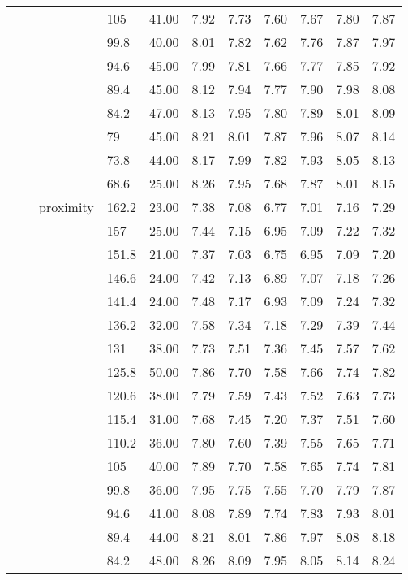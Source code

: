 \begin{longtable}{llllrrrrrrr}
   &  &  & 105 & 41.00 & 7.92 & 7.73 & 7.60 & 7.67 & 7.80 & 7.87 \\ 
   &  &  & 99.8 & 40.00 & 8.01 & 7.82 & 7.62 & 7.76 & 7.87 & 7.97 \\ 
   &  &  & 94.6 & 45.00 & 7.99 & 7.81 & 7.66 & 7.77 & 7.85 & 7.92 \\ 
   &  &  & 89.4 & 45.00 & 8.12 & 7.94 & 7.77 & 7.90 & 7.98 & 8.08 \\ 
   &  &  & 84.2 & 47.00 & 8.13 & 7.95 & 7.80 & 7.89 & 8.01 & 8.09 \\ 
   &  &  & 79 & 45.00 & 8.21 & 8.01 & 7.87 & 7.96 & 8.07 & 8.14 \\ 
   &  &  & 73.8 & 44.00 & 8.17 & 7.99 & 7.82 & 7.93 & 8.05 & 8.13 \\ 
   &  &  & 68.6 & 25.00 & 8.26 & 7.95 & 7.68 & 7.87 & 8.01 & 8.15 \\ 
   &  & proximity & 162.2 & 23.00 & 7.38 & 7.08 & 6.77 & 7.01 & 7.16 & 7.29 \\ 
   &  &  & 157 & 25.00 & 7.44 & 7.15 & 6.95 & 7.09 & 7.22 & 7.32 \\ 
   &  &  & 151.8 & 21.00 & 7.37 & 7.03 & 6.75 & 6.95 & 7.09 & 7.20 \\ 
   &  &  & 146.6 & 24.00 & 7.42 & 7.13 & 6.89 & 7.07 & 7.18 & 7.26 \\ 
   &  &  & 141.4 & 24.00 & 7.48 & 7.17 & 6.93 & 7.09 & 7.24 & 7.32 \\ 
   &  &  & 136.2 & 32.00 & 7.58 & 7.34 & 7.18 & 7.29 & 7.39 & 7.44 \\ 
   &  &  & 131 & 38.00 & 7.73 & 7.51 & 7.36 & 7.45 & 7.57 & 7.62 \\ 
   &  &  & 125.8 & 50.00 & 7.86 & 7.70 & 7.58 & 7.66 & 7.74 & 7.82 \\ 
   &  &  & 120.6 & 38.00 & 7.79 & 7.59 & 7.43 & 7.52 & 7.63 & 7.73 \\ 
   &  &  & 115.4 & 31.00 & 7.68 & 7.45 & 7.20 & 7.37 & 7.51 & 7.60 \\ 
   &  &  & 110.2 & 36.00 & 7.80 & 7.60 & 7.39 & 7.55 & 7.65 & 7.71 \\ 
   &  &  & 105 & 40.00 & 7.89 & 7.70 & 7.58 & 7.65 & 7.74 & 7.81 \\ 
   &  &  & 99.8 & 36.00 & 7.95 & 7.75 & 7.55 & 7.70 & 7.79 & 7.87 \\ 
   &  &  & 94.6 & 41.00 & 8.08 & 7.89 & 7.74 & 7.83 & 7.93 & 8.01 \\ 
   &  &  & 89.4 & 44.00 & 8.21 & 8.01 & 7.86 & 7.97 & 8.08 & 8.18 \\ 
   &  &  & 84.2 & 48.00 & 8.26 & 8.09 & 7.95 & 8.05 & 8.14 & 8.24 \\ 

\end{longtable}
